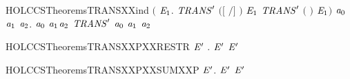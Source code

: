\begin{SaveVerbatim}{HOLCCSTheoremsTRANSXXind}
     \ensuremath{(}\HOLSymConst{\HOLTokenForall{}}   \ensuremath{\HOLBoundVar{E}\sb{\mathrm{1}}}.
        \ensuremath{\HOLBoundVar{TRANS}\sp{\prime{}}} \ensuremath{(}\ensuremath{[}  \ensuremath{/}\ensuremath{]} \ensuremath{)}  \ensuremath{\HOLBoundVar{E}\sb{\mathrm{1}}} \HOLSymConst{\HOLTokenImp{}} \ensuremath{\HOLBoundVar{TRANS}\sp{\prime{}}} \ensuremath{(}  \ensuremath{)}  \ensuremath{\HOLBoundVar{E}\sb{\mathrm{1}}}\ensuremath{)} \HOLSymConst{\HOLTokenImp{}}
     \HOLSymConst{\HOLTokenForall{}}\ensuremath{\HOLBoundVar{a}\sb{\mathrm{0}}} \ensuremath{\HOLBoundVar{a}\sb{\mathrm{1}}} \ensuremath{\HOLBoundVar{a}\sb{\mathrm{2}}}. \ensuremath{\HOLBoundVar{a}\sb{\mathrm{0}}} \HOLTokenTransBegin\ensuremath{\HOLBoundVar{a}\sb{\mathrm{1}}}\HOLTokenTransEnd \ensuremath{\HOLBoundVar{a}\sb{\mathrm{2}}} \HOLSymConst{\HOLTokenImp{}} \ensuremath{\HOLBoundVar{TRANS}\sp{\prime{}}} \ensuremath{\HOLBoundVar{a}\sb{\mathrm{0}}} \ensuremath{\HOLBoundVar{a}\sb{\mathrm{1}}} \ensuremath{\HOLBoundVar{a}\sb{\mathrm{2}}}
\end{SaveVerbatim}
\newcommand{\HOLCCSTheoremsTRANSXXind}{\UseVerbatim{HOLCCSTheoremsTRANSXXind}}
\begin{SaveVerbatim}{HOLCCSTheoremsTRANSXXPXXRESTR}
\HOLTokenTurnstile{} \HOLSymConst{\HOLTokenForall{}}  \ensuremath{\HOLBoundVar{E}\sp{\prime{}}} .    \HOLTokenTransBegin{}\HOLTokenTransEnd {}  \ensuremath{\HOLBoundVar{E}\sp{\prime{}}} \HOLSymConst{\HOLTokenImp{}}  \HOLTokenTransBegin{}\HOLTokenTransEnd \ensuremath{\HOLBoundVar{E}\sp{\prime{}}}
\end{SaveVerbatim}
\newcommand{\HOLCCSTheoremsTRANSXXPXXRESTR}{\UseVerbatim{HOLCCSTheoremsTRANSXXPXXRESTR}}
\begin{SaveVerbatim}{HOLCCSTheoremsTRANSXXPXXSUMXXP}
\HOLTokenTurnstile{} \HOLSymConst{\HOLTokenForall{}}  \ensuremath{\HOLBoundVar{E}\sp{\prime{}}}.  \HOLSymConst{\ensuremath{+}}  \HOLTokenTransBegin{}\HOLTokenTransEnd \ensuremath{\HOLBoundVar{E}\sp{\prime{}}} \HOLSymConst{\HOLTokenImp{}}  \HOLTokenTransBegin{}\HOLTokenTransEnd \ensuremath{\HOLBoundVar{E}\sp{\prime{}}}
\end{SaveVerbatim}

